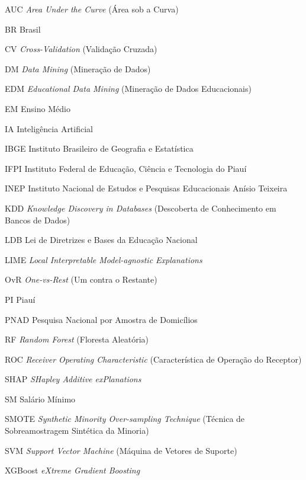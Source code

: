 \begin{siglas}
  \item[AUC] \textit{Area Under the Curve} (Área sob a Curva)
  \item[BR] Brasil
  \item[CV] \textit{Cross-Validation} (Validação Cruzada)
  \item[DM] \textit{Data Mining} (Mineração de Dados)
  \item[EDM] \textit{Educational Data Mining} (Mineração de Dados Educacionais)
  \item[EM] Ensino Médio
  \item[IA] Inteligência Artificial
  \item[IBGE] Instituto Brasileiro de Geografia e Estatística
  \item[IFPI] Instituto Federal de Educação, Ciência e Tecnologia do Piauí
  \item[INEP] Instituto Nacional de Estudos e Pesquisas Educacionais Anísio Teixeira
  \item[KDD] \textit{Knowledge Discovery in Databases} (Descoberta de Conhecimento em Bancos de Dados)
  \item[LDB] Lei de Diretrizes e Bases da Educação Nacional
  \item[LIME] \textit{Local Interpretable Model-agnostic Explanations}
  \item[OvR] \textit{One-vs-Rest} (Um contra o Restante)
  \item[PI] Piauí
  \item[PNAD] Pesquisa Nacional por Amostra de Domicílios
  \item[RF] \textit{Random Forest} (Floresta Aleatória)
  \item[ROC] \textit{Receiver Operating Characteristic} (Característica de Operação do Receptor)
  \item[SHAP] \textit{SHapley Additive exPlanations}
  \item[SM] Salário Mínimo
  \item[SMOTE] \textit{Synthetic Minority Over-sampling Technique} (Técnica de Sobreamostragem Sintética da Minoria)
  \item[SVM] \textit{Support Vector Machine} (Máquina de Vetores de Suporte)
  \item[XGBoost] \textit{eXtreme Gradient Boosting}
\end{siglas}

